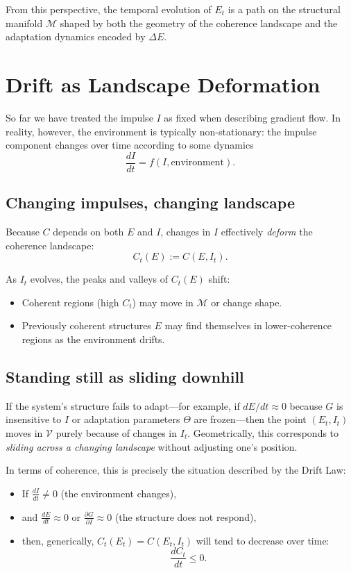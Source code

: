 \documentclass[12pt,a4paper]{report}
\begin{document}
From this perspective, the temporal evolution of \(E_t\) is a path on the structural manifold \(\mathcal{M}\) shaped by both the geometry of the coherence landscape and the adaptation dynamics encoded by $\Delta E$.

\section{Drift as Landscape Deformation}

So far we have treated the impulse \(I\) as fixed when describing gradient flow. In reality, however, the environment is typically non-stationary: the impulse component changes over time according to some dynamics
\[
    \frac{dI}{dt} = f(I, \text{environment}).
\]

\subsection*{Changing impulses, changing landscape}

Because \(C\) depends on both \(E\) and \(I\), changes in \(I\) effectively \emph{deform} the coherence landscape:
\[
    C_t(E) := C(E, I_t).
\]

As \(I_t\) evolves, the peaks and valleys of \(C_t(E)\) shift:

\begin{itemize}[leftmargin=2em]
    \item Coherent regions (high \(C_t\)) may move in \(\mathcal{M}\) or change shape.
    \item Previously coherent structures \(E\) may find themselves in lower-coherence regions as the environment drifts.
\end{itemize}

\subsection*{Standing still as sliding downhill}

If the system's structure fails to adapt---for example, if \(dE/dt \approx 0\) because \(G\) is insensitive to \(I\) or adaptation parameters \(\Theta\) are frozen---then the point \((E_t, I_t)\) moves in \(\mathcal{V}\) purely because of changes in \(I_t\). Geometrically, this corresponds to \emph{sliding across a changing landscape} without adjusting one's position.

In terms of coherence, this is precisely the situation described by the Drift Law:

\begin{itemize}[leftmargin=2em]
    \item If \(\frac{dI}{dt} \neq 0\) (the environment changes),
    \item and \(\frac{dE}{dt} \approx 0\) or \(\frac{\partial G}{\partial I} \approx 0\) (the structure does not respond),
    \item then, generically, \(C_t(E_t) = C(E_t, I_t)\) will tend to decrease over time:
    \[
        \frac{dC_t}{dt} \leq 0.
    \]
\end{itemize}
\end{document}
